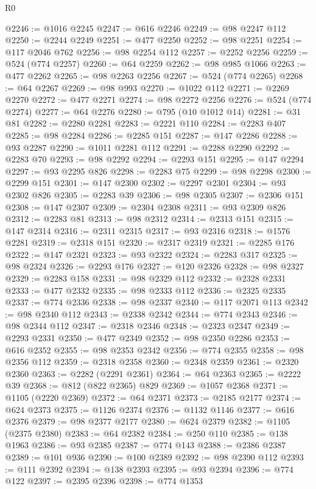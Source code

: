 \begin{lexlean}{R0}
\begin{coremodule}
@2246 := @1016 @2245
@2247 := @616 @2246
@2249 := @98 @2247 @112
@2250 := @2244 @2249
@2251 := @477 @2250
@2252 := @98 @2251
@2254 := @117 @2046 @762
@2256 := @98 @2254 @112
@2257 := @2252 @2256
@2259 := @524 (@774 @2257)
@2260 := @64 @2259
@2262 := @98 @985 @1066
@2263 := @477 @2262
@2265 := @98 @2263 @2256
@2267 := @524 (@774 @2265)
@2268 := @64 @2267
@2269 := @98 @993
@2270 := @1022 @112
@2271 := @2269 @2270
@2272 := @477 @2271
@2274 := @98 @2272 @2256
@2276 := @524 (@774 @2274)
@2277 := @64 @2276
@2280 := @795 (@10 @1012 @14)
@2281 := @31 @81
@2282 := @2280 @2281
@2283 := @2221 @110
@2284 := @2283 @407
@2285 := @98 @2284
@2286 := @2285 @151
@2287 := @147 @2286
@2288 := @93 @2287
@2290 := @1011 @2281 @112
@2291 := @2288 @2290
@2292 := @2283 @70
@2293 := @98 @2292
@2294 := @2293 @151
@2295 := @147 @2294
@2297 := @93 @2295 @826
@2298 := @2283 @75
@2299 := @98 @2298
@2300 := @2299 @151
@2301 := @147 @2300
@2302 := @2297 @2301
@2304 := @93 @2302 @826
@2305 := @2283 @39
@2306 := @98 @2305
@2307 := @2306 @151
@2308 := @147 @2307
@2309 := @2304 @2308
@2311 := @93 @2309 @826
@2312 := @2283 @81
@2313 := @98 @2312
@2314 := @2313 @151
@2315 := @147 @2314
@2316 := @2311 @2315
@2317 := @93 @2316
@2318 := @1576 @2281
@2319 := @2318 @151
@2320 := @2317 @2319
@2321 := @2285 @176
@2322 := @147 @2321
@2323 := @93 @2322
@2324 := @2283 @317
@2325 := @98 @2324
@2326 := @2293 @176
@2327 := @120 @2326
@2328 := @98 @2327
@2329 := @2283 @158
@2331 := @98 @2329 @112
@2332 := @2328 @2331
@2333 := @477 @2332
@2335 := @98 @2333 @112
@2336 := @2325 @2335
@2337 := @774 @2336
@2338 := @98 @2337
@2340 := @117 @2071 @113
@2342 := @98 @2340 @112
@2343 := @2338 @2342
@2344 := @774 @2343
@2346 := @98 @2344 @112
@2347 := @2318 @2346
@2348 := @2323 @2347
@2349 := @2293 @2331
@2350 := @477 @2349
@2352 := @98 @2350 @2286
@2353 := @616 @2352
@2355 := @98 @2353 @2342
@2356 := @774 @2355
@2358 := @98 @2356 @112
@2359 := @2318 @2358
@2360 := @2348 @2359
@2361 := @2320 @2360
@2363 := @2282 (@2291 @2361)
@2364 := @64 @2363
@2365 := @2222 @39
@2368 := @812 (@822 @2365) @829
@2369 := @1057 @2368
@2371 := @1105 (@2220 @2369)
@2372 := @64 @2371
@2373 := @2185 @2177
@2374 := @624 @2373
@2375 := @1126 @2374
@2376 := @1132 @1146
@2377 := @616 @2376
@2379 := @98 @2377 @2177
@2380 := @624 @2379
@2382 := @1105 (@2375 @2380)
@2383 := @64 @2382
@2384 := @250 @110
@2385 := @138 @1963
@2386 := @93 @2385
@2387 := @774 @143
@2388 := @2386 @2387
@2389 := @101 @936
@2390 := @100 @2389
@2392 := @98 @2390 @112
@2393 := @111 @2392
@2394 := @138 @2393
@2395 := @93 @2394
@2396 := @774 @122
@2397 := @2395 @2396
@2398 := @774 @1353

\end{coremodule}
\end{lexlean}

